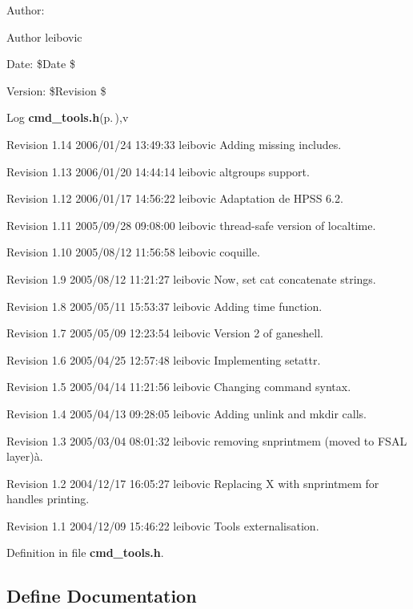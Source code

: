 \begin{Desc}
\item[Author:]\begin{Desc}
\item[Author]leibovic \end{Desc}
\end{Desc}
\begin{Desc}
\item[Date:]\$Date \$ \end{Desc}
\begin{Desc}
\item[Version:]\$Revision \$ \end{Desc}
\begin{Desc}
\item[Log]{\bf cmd\_\-tools.h}{\rm (p.\,\pageref{cmd__tools_8h})},v \end{Desc}
Revision 1.14 2006/01/24 13:49:33 leibovic Adding missing includes.

Revision 1.13 2006/01/20 14:44:14 leibovic altgroups support.

Revision 1.12 2006/01/17 14:56:22 leibovic Adaptation de HPSS 6.2.

Revision 1.11 2005/09/28 09:08:00 leibovic thread-safe version of localtime.

Revision 1.10 2005/08/12 11:56:58 leibovic coquille.

Revision 1.9 2005/08/12 11:21:27 leibovic Now, set cat concatenate strings.

Revision 1.8 2005/05/11 15:53:37 leibovic Adding time function.

Revision 1.7 2005/05/09 12:23:54 leibovic Version 2 of ganeshell.

Revision 1.6 2005/04/25 12:57:48 leibovic Implementing setattr.

Revision 1.5 2005/04/14 11:21:56 leibovic Changing command syntax.

Revision 1.4 2005/04/13 09:28:05 leibovic Adding unlink and mkdir calls.

Revision 1.3 2005/03/04 08:01:32 leibovic removing snprintmem (moved to FSAL layer)\`{a}.

Revision 1.2 2004/12/17 16:05:27 leibovic Replacing X with snprintmem for handles printing.

Revision 1.1 2004/12/09 15:46:22 leibovic Tools externalisation.

Definition in file {\bf cmd\_\-tools.h}.

\subsection{Define Documentation}
